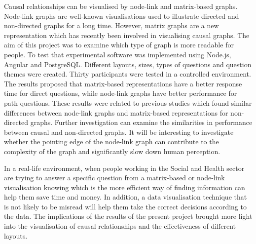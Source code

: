 \documentclass{l4proj}
\begin{document}
Causal relationships can be visualised by node-link and matrix-based graphs. Node-link graphs are well-known visualisations used to illustrate directed and non-directed graphs for a long time. However, matrix graphs are a new representation which has recently been involved in visualising causal graphs. The aim of this project was to examine which type of graph is more readable for people. To test that experimental software was implemented using Node.js, Angular and PostgreSQL. Different layouts, sizes, types of questions and question themes were created. Thirty participants were tested in a controlled environment. The results proposed that matrix-based representations have a better response time for direct questions, while node-link graphs have better performance for path questions. These results were related to previous studies which found similar differences between node-link graphs and matrix-based representations for non-directed graphs. Further investigation can examine the similarities in performance between causal and non-directed graphs. It will be interesting to investigate whether the pointing edge of the node-link graph can contribute to the complexity of the graph and significantly slow down human perception.

In a real-life environment, when people working in the Social and Health sector are trying to answer a specific question from a matrix-based or node-link visualisation knowing which is the more efficient way of finding information can help them save time and money. In addition, a data visualisation technique that is not likely to be misread will help them take the correct decisions according to the data. The implications of the results of the present project brought more light into the visualisation of causal relationships and the effectiveness of different layouts.
\end{document}
